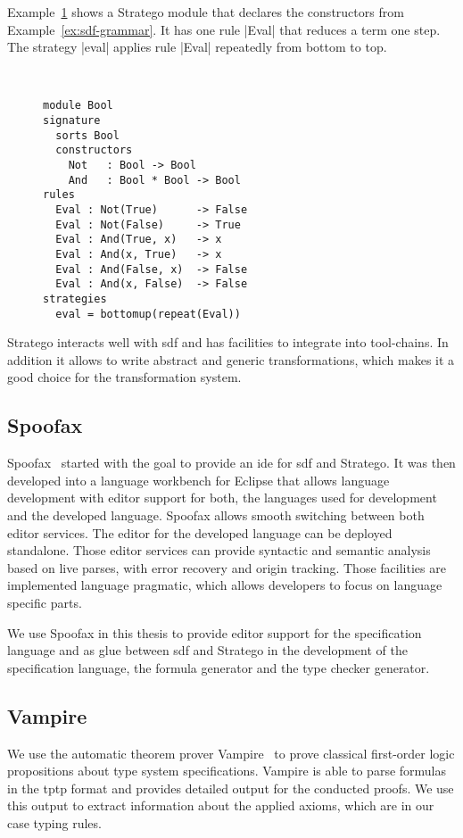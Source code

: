 Example~\ref{ex:stratego-module} shows a Stratego module that declares
the constructors from Example~\ref{ex:sdf-grammar}. It has one rule
\code|Eval| that reduces a term one step. The strategy \code|eval|
applies rule \code|Eval| repeatedly from bottom to top.

\begin{figure}
\begin{example}{~}
\begin{lstlisting}[language=stratego]
module Bool
signature
  sorts Bool
  constructors
    Not   : Bool -> Bool 
    And   : Bool * Bool -> Bool
rules
  Eval : Not(True)      -> False
  Eval : Not(False)     -> True
  Eval : And(True, x)   -> x
  Eval : And(x, True)   -> x
  Eval : And(False, x)  -> False
  Eval : And(x, False)  -> False
strategies
  eval = bottomup(repeat(Eval))
\end{lstlisting}
\label{ex:stratego-module}
\end{example}
\end{figure}

Stratego interacts well with \gls{sdf} and has facilities to integrate
into tool-chains. In addition it allows to write abstract and generic
transformations, which makes it a good choice for the transformation
system.

\subsection{Spoofax}
Spoofax~\cite{KatsV10} started with the goal to provide an \gls{ide}
for \gls{sdf} and Stratego. It was then developed into a language
workbench for Eclipse that allows language development with editor
support for both, the languages used for development and the developed
language. Spoofax allows smooth switching between both editor
services. The editor for the developed language can be deployed
standalone. Those editor services can provide syntactic and semantic
analysis based on live parses, with error recovery and origin
tracking. Those facilities are implemented language pragmatic, which
allows developers to focus on language specific parts.

We use Spoofax in this thesis to provide editor support for the
specification language and as glue between \gls{sdf} and Stratego in
the development of the specification language, the formula generator
and the type checker generator.

\subsection{Vampire}
We use the automatic theorem prover Vampire~\cite{VoronkovVampire} to
prove classical first-order logic propositions about type system
specifications. Vampire is able to parse formulas in the \gls{tptp}
format and provides detailed output for the conducted proofs. We use
this output to extract information about the applied axioms, which are
in our case typing rules.

